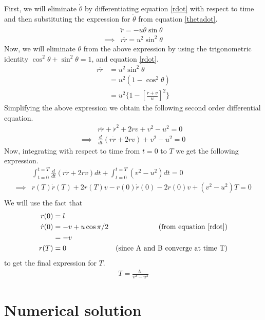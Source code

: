 \documentclass{article}
\begin{document}
First,
we will eliminate $\dot{\theta}$
by differentiating equation \ref{rdot}
with respect to time
and then substituting the expression for $\dot{\theta}$
from equation \ref{thetadot}.
\begin{align*}
	& \ddot{r} = - u \dot{\theta} \sin \theta \\
	\implies & r \ddot{r} = u^2 \sin^2 \theta
\end{align*}
Now, we will eliminate $\theta$ from the above expression
by using the trigonometric identity
$\cos^2 \theta + \sin^2 \theta = 1$,
and equation \ref{rdot}.
\begin{align*}
	r \ddot{r} &= u^2 \sin^2 \theta \\
	&= u^2 (1 - \cos^2 \theta) \\
	&= u^2 \{1 - \left[\frac{\dot{r}+v}{u}\right]^2 \}
\end{align*}
Simplifying the above expression
we obtain the following second order differential equation.
\begin{align}
	& r\ddot{r} + \dot{r}^2 + 2\dot{r}v + v^2 - u^2 = 0 \\
	\implies & \frac{d}{dt}(r\dot{r} + 2rv) + v^2 - u^2 = 0 
	\label{r1stod}
\end{align}
Now, integrating with respect to time from $t = 0$ to $T$
we get the following expression.
\begin{align*}
	& \int_{t=0}^{t=T} \frac{d}{dt}(r\dot{r} + 2rv) dt
	+ \int_{t=0}^{t=T} (v^2 - u^2) dt = 0 \\
	\implies & r(T)\dot{r}(T) + 2r(T)v - r(0)\dot{r}(0) - 2r(0)v
	+ (v^2 - u^2)T = 0 \\
\end{align*}
We will use the fact that
\begin{align*}
	r(0) &= l \\
	\dot{r}(0) &= -v + u \cos \pi/2  & \mbox{(from equation \ref{rdot})}\\
	&= -v \\
	r(T) &= 0 & \mbox{(since A and B converge at time T)}
\end{align*}
to get the final expression for $T$.
\begin{align}
	T = \frac{lv}{v^2 - u^2} \label{ans}
\end{align}

\section{Numerical solution}
\end{document}
